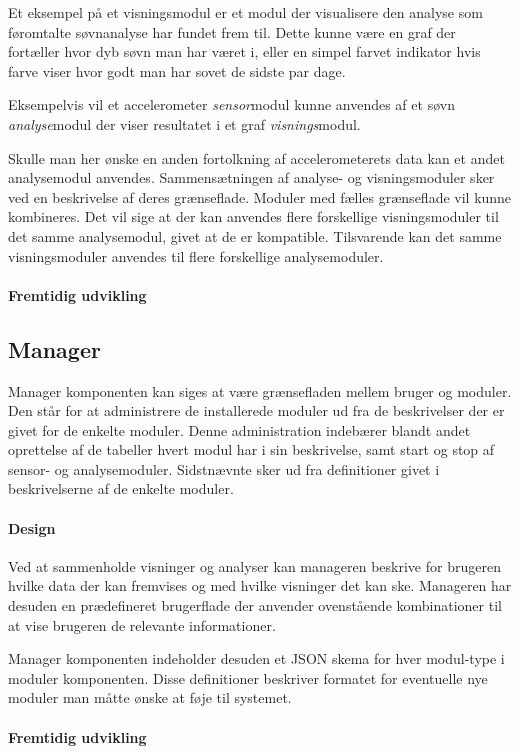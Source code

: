 Et eksempel på et visningsmodul er et modul der visualisere den analyse som føromtalte søvnanalyse har fundet frem til.
Dette kunne være en graf der fortæller hvor dyb søvn man har været i, eller en simpel farvet indikator hvis farve viser hvor godt man har sovet de sidste par dage.

Eksempelvis vil et accelerometer \textit{sensor}modul kunne anvendes af et søvn \textit{analyse}modul der viser resultatet i et graf \textit{visnings}modul.

Skulle man her ønske en anden fortolkning af accelerometerets data kan et andet analysemodul anvendes.
Sammensætningen af analyse- og visningsmoduler sker ved en beskrivelse af deres grænseflade.
Moduler med fælles grænseflade vil kunne kombineres.
Det vil sige at der kan anvendes flere forskellige visningsmoduler til det samme analysemodul, givet at de er kompatible.
Tilsvarende kan det samme visningsmoduler anvendes til flere forskellige analysemoduler.

\paragraph{Fremtidig udvikling}


\subsection*{Manager}\label{subsec:arkitektur-Manager}
Manager komponenten kan siges at være grænsefladen mellem bruger og moduler.
Den står for at administrere de installerede moduler ud fra de beskrivelser der er givet for de enkelte moduler.
Denne administration indebærer blandt andet oprettelse af de tabeller hvert modul har i sin beskrivelse, samt start og stop af sensor- og analysemoduler.
Sidstnævnte sker ud fra definitioner givet i beskrivelserne af de enkelte moduler.

\paragraph{Design}
Ved at sammenholde visninger og analyser kan manageren beskrive for brugeren hvilke data der kan fremvises og med hvilke visninger det kan ske.
Manageren har desuden en prædefineret brugerflade der anvender ovenstående kombinationer til at vise brugeren de relevante informationer.

Manager komponenten indeholder desuden et JSON skema for hver modul-type i moduler komponenten.
Disse definitioner beskriver formatet for eventuelle nye moduler man måtte ønske at føje til systemet.


\paragraph{Fremtidig udvikling}



